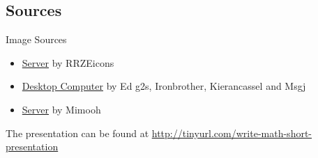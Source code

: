 \subsection{Sources}
\begin{frame}{Image Sources}
    \begin{itemize}
	\item \href{https://commons.wikimedia.org/wiki/File:Server-multiple.svg}{Server} by RRZEicons
    \item \href{https://commons.wikimedia.org/wiki/File:Computer-aj_aj_ashton_01.svg}{Desktop Computer} by Ed g2s,
          Ironbrother, Kierancassel and Msgj
    \item \href{https://commons.wikimedia.org/wiki/File:Server_by_mimooh.svg}{Server} by Mimooh
    \end{itemize}

    The presentation can be found at \url{http://tinyurl.com/write-math-short-presentation}
\end{frame}

